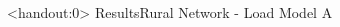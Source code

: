 \documentclass[xcolor=svgnames,aspectratio=32,8pt]{beamer}
\begin{document}

\begin{frame}<handout:0>
  {Results}{Rural Network - Load Model A}
  \begin{changemargin}{-1cm}{-1cm}
  \centering
  \vspace{0.4cm}
    \begin{minipage}[!h]{0.5\paperwidth}
    \centering
      \setlength\figureheight{3.5cm}
      \setlength\figurewidth{0.35\paperwidth}
      
    \end{minipage}%
    \begin{minipage}[!h]{0.5\paperwidth}
    \centering
      \setlength\figureheight{3.5cm}
      \setlength\figurewidth{0.35\paperwidth}
      
    \end{minipage}\\
  \end{changemargin}
\end{frame}

\end{document}
